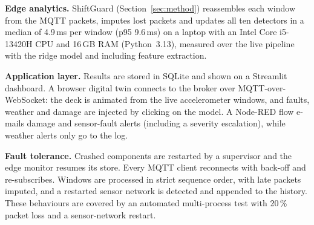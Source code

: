 \documentclass[conference]{IEEEtran}
\begin{document}
\textbf{Edge analytics.} ShiftGuard (Section~\ref{sec:method}) reassembles each window from the MQTT packets, imputes lost packets and updates all ten detectors in a median of 4.9\,ms per window (p95 9.6\,ms) on a laptop with an Intel Core i5-13420H CPU and 16\,GB RAM (Python~3.13), measured over the live pipeline with the ridge model and including feature extraction.

\textbf{Application layer.} Results are stored in SQLite and shown on a Streamlit dashboard. A browser digital twin connects to the broker over MQTT-over-WebSocket: the deck is animated from the live accelerometer windows, and faults, weather and damage are injected by clicking on the model. A Node-RED flow e-mails damage and sensor-fault alerts (including a severity escalation), while weather alerts only go to the log.

\textbf{Fault tolerance.} Crashed components are restarted by a supervisor and the edge monitor resumes its store. Every MQTT client reconnects with back-off and re-subscribes. Windows are processed in strict sequence order, with late packets imputed, and a restarted sensor network is detected and appended to the history. These behaviours are covered by an automated multi-process test with 20\,\% packet loss and a sensor-network restart.
\end{document}
